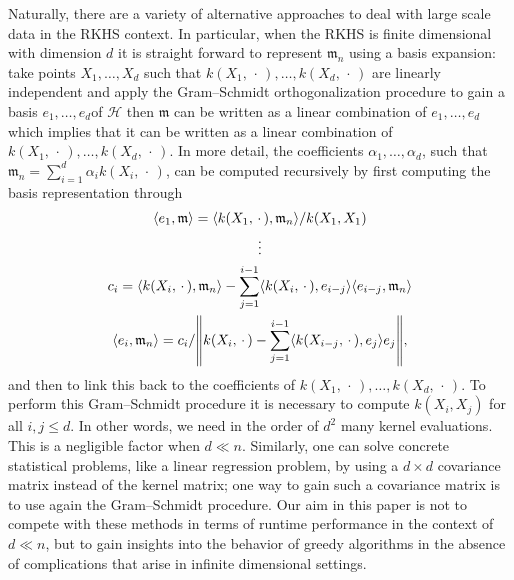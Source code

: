 \documentclass[10pt]{amsart}
\theoremstyle{definition}\newtheorem{defi}[theo]{Definition}\newtheorem{rema}[theo]{Remark}\newtheorem{exam}[theo]{Example}\newtheorem{exem}[theo]{Example}\newtheorem{nota}[theo]{Notation}
\theoremstyle{remark}
\newcommand{\cH}{\mathcal{H}}
\newcommand{\mean}{\mathfrak{m}}
\let\originalleft\left
\let\originalright\right
\renewcommand{\left}{\mathopen{}\mathclose\bgroup\originalleft}
\renewcommand{\right}{\aftergroup\egroup\originalright}
\begin{document}
Naturally, there are a variety of alternative approaches to deal with large scale data in the RKHS context. In particular, when the RKHS is finite dimensional with dimension $d$ it is straight forward to represent $\mean_n$ using a basis expansion: take points $X_1,\dots, X_d$ such that $k(X_1,\,\cdot\,), \dots, k(X_d,\,\cdot\,)$ are linearly independent and apply the Gram--Schmidt orthogonalization procedure to gain a basis $e_1,\dots, e_d$\linebreak of $\cH$ then $\mean$ can be written as a linear combination of $e_1, \dots, e_d$ which implies that it can be written as a linear combination of $k(X_1,\,\cdot\,), \dots, k(X_d,\,\cdot\,)$. In more detail, the\pagebreak{} coefficients $\alpha_1,\dots, \alpha_d$, such that $\mean_n = \sum_{i=1}^d \alpha_i k(X_i,\,\cdot\,)$, can be computed recursively by first computing the basis representation through
\begin{gather*}
\langle e_1, \mean \rangle = \langle k(X_1,\,\cdot\,), \mean_n \rangle /k(X_1,X_1) \\
\vdots \\
c_i = \langle k(X_i,\,\cdot\,), \mean_n \rangle - \sum_{j=1}^{i-1} \langle k(X_i,\,\cdot\,), e_{i-j} \rangle \langle e_{i-j}, \mean_n \rangle \\
\langle e_i, \mean_n \rangle = c_i / \left\| k(X_i,\,\cdot\,) - \sum_{j=1}^{i-1} \left\langle k(X_{i-j},\,\cdot\,), e_j \right\rangle e_j\right\|,
\end{gather*}
and then to link this back to the coefficients of $k(X_1,\,\cdot\,), \dots, k(X_d,\,\cdot\,)$. To perform this Gram--Schmidt procedure it is necessary to compute $k(X_i,X_j)$ for all $i,j \leq d$. In other words, we need in the order of $d^2$ many kernel evaluations. This is a negligible factor when $d \ll n$. Similarly, one can solve concrete statistical problems, like a linear regression problem, by using a $d\times d$ covariance matrix instead of the kernel matrix; one way to gain such a covariance matrix is to use again the Gram--Schmidt procedure. Our aim in this paper is not to compete with these methods in terms of runtime performance in the context of $d \ll n$, but to gain insights into the behavior of greedy algorithms in the absence of complications that arise in infinite dimensional settings.
\end{document}

